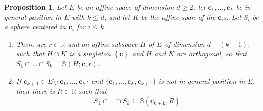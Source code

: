 \documentclass[12pt]{amsart}
\newcommand{\R}{\mathbb{R}}	%
\newcommand{\set}[1]{\mathopen \{ {#1} \mathclose \}} %
\newcommand{\setLR}[1]{\left \{ {#1} \right \}} %
\theoremstyle{plain}
\newtheorem{proposition}[theorem]{Proposition}
\theoremstyle{definition}
\theoremstyle{remark}
\begin{document}
\begin{proposition}\label{prop:intersectionofspheres}
Let \( E \) be an affine space of dimension \( d \geq 2 \), let \( \mathbf{c}_1 , \dots , \mathbf{c}_k \) be in general position in \( E \) with \( k \leq d \), and let \( K \) be the affine span of the \( \mathbf{c}_i \)s.
Let \( S_i \) be a sphere centered in \( \mathbf{c}_i \) for \( i \leq k \).
\begin{enumerate}[label={\upshape (\alph*)}]
\item\label{prop:intersectionofspheres-a}
There are \( r \in \R \) and an affine subspace \( H \) of \( E \) of dimension \( d - ( k - 1 ) \), such that \( H \cap K \) is a singleton \( \setLR{ \mathbf{c}} \) and \( H \) and \( K \) are orthogonal, so that \( S_1 \cap \dots \cap S_k = \mathbb{S} ( H ; \mathbf{c} , r ) \).
\item\label{prop:intersectionofspheres-b}
If \( \mathbf{c}_{ k + 1 } \in E \setminus \set{ \mathbf{c}_1 , \dots , \mathbf{c}_k } \) and \( \set{ \mathbf{c}_1 , \dots , \mathbf{c}_k ,\mathbf{c}_{ k + 1 } } \) is not in general position in \( E \), then there is \( R \in \R \) such that
\[
 S_1 \cap \dots \cap S_k \subseteq \mathbb{S} ( \mathbf{c}_{ k + 1 } , R ) .
\] 
\end{enumerate}
\end{proposition}
\end{document}
